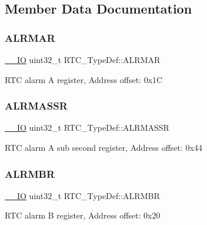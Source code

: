 \subsection{Member Data Documentation}
\mbox{\label{struct_r_t_c___type_def_ad7e54d5c5a4b9fd1e26aca85b1e36c7f}} 
\subsubsection{\texorpdfstring{ALRMAR}{ALRMAR}}
{\footnotesize\ttfamily \mbox{\hyperlink{core__sc300_8h_aec43007d9998a0a0e01faede4133d6be}{\+\_\+\+\_\+\+IO}} uint32\+\_\+t R\+T\+C\+\_\+\+Type\+Def\+::\+A\+L\+R\+M\+AR}

R\+TC alarm A register, Address offset\+: 0x1C \mbox{\label{struct_r_t_c___type_def_ac5b2e3c0dcdcb569f3fe15dfe3794bc1}} 
\subsubsection{\texorpdfstring{ALRMASSR}{ALRMASSR}}
{\footnotesize\ttfamily \mbox{\hyperlink{core__sc300_8h_aec43007d9998a0a0e01faede4133d6be}{\+\_\+\+\_\+\+IO}} uint32\+\_\+t R\+T\+C\+\_\+\+Type\+Def\+::\+A\+L\+R\+M\+A\+S\+SR}

R\+TC alarm A sub second register, Address offset\+: 0x44 \mbox{\label{struct_r_t_c___type_def_a9816616e1f00955c8982469d0dd9c953}} 
\subsubsection{\texorpdfstring{ALRMBR}{ALRMBR}}
{\footnotesize\ttfamily \mbox{\hyperlink{core__sc300_8h_aec43007d9998a0a0e01faede4133d6be}{\+\_\+\+\_\+\+IO}} uint32\+\_\+t R\+T\+C\+\_\+\+Type\+Def\+::\+A\+L\+R\+M\+BR}

R\+TC alarm B register, Address offset\+: 0x20 \mbox{\label{struct_r_t_c___type_def_a249009cd672e7bcd52df1a41de4619e1}} 
